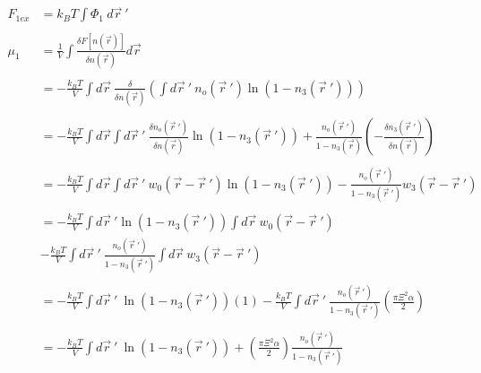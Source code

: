 \documentclass[double,12pt]{revtex4-2}
\begin{document}
\begin{align}
    F_{1ex} &= k_BT\int \Phi_1~d\vec r~' \\ \nonumber\\
    \mu_1 &= \frac{1}{V}\int \frac{\delta F[n(\vec r)]}{\delta n(\vec r)} d\vec r \\ \nonumber\\
%
        &= -\frac{k_BT}{V} \int d\vec r ~\frac{\delta}
        {\delta n(\vec r)}\left(\int d\vec r~'~n_o(\vec r~')\ln(1-n_3(\vec r~'))\right) \\ \nonumber\\
%
        &= -\frac{k_BT}{V}\int d\vec r\int d\vec r~'~\frac{\delta n_o(\vec r~')}
        {\delta n(\vec r)}\ln(1-n_3(\vec r~'))+\frac{n_o(\vec r~')}
          {1-n_3(\vec r)}\left(-\frac{\delta n_3(\vec r~')}{\delta n(\vec r)}
          \right) \\ \nonumber\\
%
        &= -\frac{k_BT}{V} \int d\vec r \int d\vec r~' ~w_0(\vec r - \vec r~')
          \ln(1-n_3(\vec r~')) - \frac{n_o(\vec r~')}
          {1-n_3(\vec r~')}w_3(\vec r - \vec r~') \\ \nonumber\\
%
        &= -\frac{k_BT}{V} \int d\vec r~'\ln(1-n_3(\vec r~')) \int d \vec r  
          ~w_0(\vec r - \vec r~') \nonumber\\
        &- \frac{k_BT}{V} \int d\vec r~' ~\frac{n_o(\vec r~')}{1-n_3(\vec r~')} 
          \int d \vec r~w_3(\vec r - \vec r~')  \\ \\
%
        &= -\frac{k_BT}{V} \int d\vec r~' ~\ln(1-n_3(\vec r~'))(1)
          - \frac{k_BT}{V} \int d\vec r~' ~\frac{n_o(\vec r~')}{1-n_3(\vec r~')}
          \left(\frac{\pi\Xi^2\alpha}{2}\right) \\ \\
%
        &= -\frac{k_BT}{V}\int d\vec r~'~ \ln(1-n_3(\vec r~'))+\left(
        \frac{\pi\Xi^2\alpha}{2}\right)\frac{n_o(\vec r~')}{1-n_3(\vec r~')}
\end{align}
\end{document}
